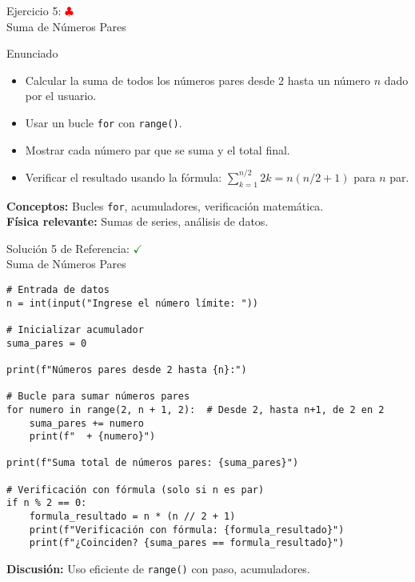 \documentclass[10pt]{beamer}
\begin{document}
\begin{frame}{Ejercicio 5: \hfill \textcolor{red}{$\clubsuit$} \\ Suma de Números Pares}
  \begin{block}{Enunciado}
    \begin{itemize}
      \item Calcular la suma de todos los números pares desde 2 hasta un número \(n\) dado por el usuario.
      \item Usar un bucle \texttt{for} con \texttt{range()}.
      \item Mostrar cada número par que se suma y el total final.
      \item Verificar el resultado usando la fórmula: $\sum_{k=1}^{n/2} 2k = n(n/2 + 1)$ para \(n\) par.
    \end{itemize}
  \end{block}
  
  \textbf{Conceptos:} Bucles \texttt{for}, acumuladores, verificación matemática.
  \\
  \textbf{Física relevante:} Sumas de series, análisis de datos.
\end{frame}

\begin{frame}[fragile]{Solución 5 de Referencia: \hfill \textcolor{green}{$\checkmark$} \\ Suma de Números Pares}
\begin{verbatim}
# Entrada de datos
n = int(input("Ingrese el número límite: "))

# Inicializar acumulador
suma_pares = 0

print(f"Números pares desde 2 hasta {n}:")

# Bucle para sumar números pares
for numero in range(2, n + 1, 2):  # Desde 2, hasta n+1, de 2 en 2
    suma_pares += numero
    print(f"  + {numero}")

print(f"Suma total de números pares: {suma_pares}")

# Verificación con fórmula (solo si n es par)
if n % 2 == 0:
    formula_resultado = n * (n // 2 + 1)
    print(f"Verificación con fórmula: {formula_resultado}")
    print(f"¿Coinciden? {suma_pares == formula_resultado}")
\end{verbatim}
\textbf{Discusión:} Uso eficiente de \texttt{range()} con paso, acumuladores.
\end{frame}
\end{document}
